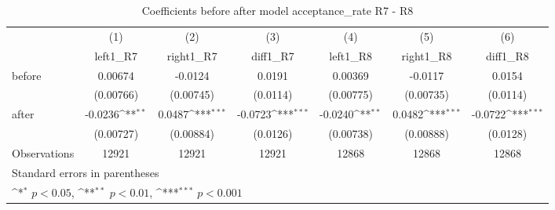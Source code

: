 \begin{table}[htbp]\centering
\def\sym#1{\ifmmode^{#1}\else\(^{#1}\)\fi}
\caption{Coefficients before after model acceptance\_rate R7 - R8}
\begin{tabular}{l*{6}{c}}
\hline\hline
                    &\multicolumn{1}{c}{(1)}&\multicolumn{1}{c}{(2)}&\multicolumn{1}{c}{(3)}&\multicolumn{1}{c}{(4)}&\multicolumn{1}{c}{(5)}&\multicolumn{1}{c}{(6)}\\
                    &\multicolumn{1}{c}{left1\_R7}&\multicolumn{1}{c}{right1\_R7}&\multicolumn{1}{c}{diff1\_R7}&\multicolumn{1}{c}{left1\_R8}&\multicolumn{1}{c}{right1\_R8}&\multicolumn{1}{c}{diff1\_R8}\\
\hline
before              &     0.00674         &     -0.0124         &      0.0191         &     0.00369         &     -0.0117         &      0.0154         \\
                    &   (0.00766)         &   (0.00745)         &    (0.0114)         &   (0.00775)         &   (0.00735)         &    (0.0114)         \\
[1em]
after               &     -0.0236\sym{**} &      0.0487\sym{***}&     -0.0723\sym{***}&     -0.0240\sym{**} &      0.0482\sym{***}&     -0.0722\sym{***}\\
                    &   (0.00727)         &   (0.00884)         &    (0.0126)         &   (0.00738)         &   (0.00888)         &    (0.0128)         \\
\hline
Observations        &       12921         &       12921         &       12921         &       12868         &       12868         &       12868         \\
\hline\hline
\multicolumn{7}{l}{\footnotesize Standard errors in parentheses}\\
\multicolumn{7}{l}{\footnotesize \sym{*} \(p<0.05\), \sym{**} \(p<0.01\), \sym{***} \(p<0.001\)}\\
\end{tabular}
\end{table}
